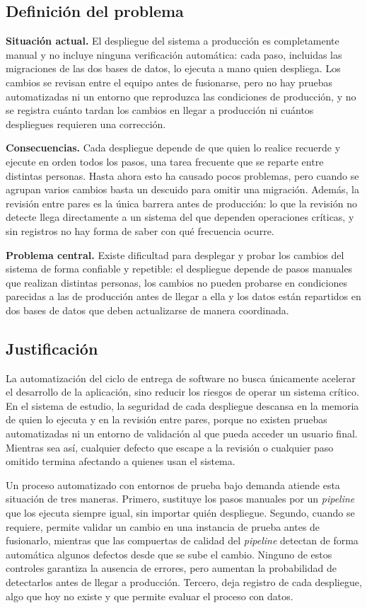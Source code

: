 \subsection{Definición del problema}
\textbf{Situación actual.} El despliegue del sistema a producción es completamente manual y no incluye ninguna
verificación automática: cada paso, incluidas las migraciones de las dos bases de datos, lo ejecuta a mano quien
despliega. Los cambios se revisan entre el equipo antes de fusionarse, pero no hay pruebas automatizadas ni un
entorno que reproduzca las condiciones de producción, y no se registra cuánto tardan los cambios en llegar a
producción ni cuántos despliegues requieren una corrección.

\textbf{Consecuencias.} Cada despliegue depende de que quien lo realice recuerde y ejecute en orden todos los
pasos, una tarea frecuente que se reparte entre distintas personas. Hasta ahora esto ha causado pocos problemas,
pero cuando se agrupan varios cambios basta un descuido para omitir una migración. Además, la revisión entre
pares es la única barrera antes de producción: lo que la revisión no detecte llega directamente a un sistema del que
dependen operaciones críticas, y sin registros no hay forma de saber con qué frecuencia ocurre.

\textbf{Problema central.} Existe dificultad para desplegar y probar los cambios del sistema de forma
confiable y repetible: el despliegue depende de pasos manuales que realizan distintas personas, los
cambios no pueden probarse en condiciones parecidas a las de producción antes de llegar a ella y los datos están
repartidos en dos bases de datos que deben actualizarse de manera coordinada.

\subsection{Justificación}
La automatización del ciclo de entrega de software no busca únicamente acelerar el desarrollo de la
aplicación, sino reducir los riesgos de operar un sistema crítico. En el sistema de estudio, la
seguridad de cada despliegue descansa en la memoria de quien lo ejecuta y en la revisión entre pares,
porque no existen pruebas automatizadas ni un entorno de validación al que pueda acceder un usuario final.
Mientras sea así, cualquier defecto que escape a la revisión o cualquier paso omitido termina afectando
a quienes usan el sistema.

Un proceso automatizado con entornos de prueba bajo demanda atiende esta situación de tres maneras.
Primero, sustituye los pasos manuales por un \emph{pipeline} que los ejecuta siempre igual,
sin importar quién despliegue. Segundo, cuando se requiere, permite validar un cambio en una
instancia de prueba antes de fusionarlo, mientras que las compuertas de calidad
del \emph{pipeline} detectan de forma automática algunos defectos desde que se sube el cambio.
Ninguno de estos controles garantiza la ausencia de errores, pero aumentan la probabilidad de
detectarlos antes de llegar a producción. Tercero, deja registro de cada despliegue, algo que hoy
no existe y que permite evaluar el proceso con datos.

